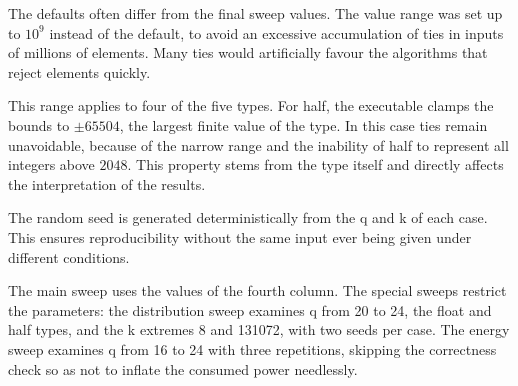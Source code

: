 The defaults often differ from the final sweep values. The value range was set
up to $10^9$ instead of the default, to avoid an excessive accumulation of ties
in inputs of millions of elements. Many ties would artificially favour the
algorithms that reject elements quickly.

This range applies to four of the five types. For half, the executable clamps
the bounds to $\pm 65504$, the largest finite value of the type. In this case
ties remain unavoidable, because of the narrow range and the inability of half
to represent all integers above $2048$. This property stems from the type
itself and directly affects the interpretation of the results.

The random seed is generated deterministically from the q and k of each case.
This ensures reproducibility without the same input ever being given under
different conditions.

The main sweep uses the values of the fourth column. The special sweeps
restrict the parameters: the distribution sweep examines q from 20 to 24, the
float and half types, and the k extremes 8 and 131072, with two seeds per case.
The energy sweep examines q from 16 to 24 with three repetitions, skipping the
correctness check so as not to inflate the consumed power needlessly.

